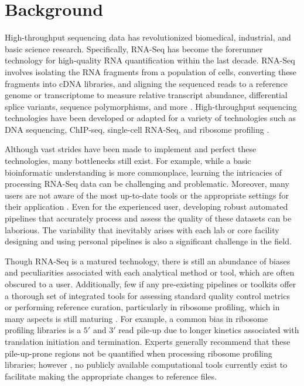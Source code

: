 \documentclass[10pt, oneside]{article}
\begin{document}
\section{Background}
High-throughput sequencing data has revolutionized biomedical, industrial, and basic science research. Specifically, RNA-Seq has become the forerunner technology for high-quality RNA quantification within the last decade. RNA-Seq involves isolating the RNA fragments from a population of cells, converting these fragments into cDNA libraries, and aligning the sequenced reads to a reference genome or transcriptome to measure relative transcript abundance, differential splice variants, sequence polymorphisms, and more \cite{byron_nrg}. High-throughput sequencing technologies have been developed or adapted for a variety of technologies such as DNA sequencing, ChIP-seq, single-cell RNA-Seq, and ribosome profiling \cite{ingolia_science}. \par
Although vast strides have been made to implement and perfect these technologies, many bottlenecks still exist. For example, while a basic bioinformatic understanding is more commonplace, learning the intricacies of processing RNA-Seq data can be challenging and problematic. Moreover, many users are not aware of the most up-to-date tools or the appropriate settings for their application \cite{costello_npjsba, funari_science}. Even for the experienced user, developing robust automated pipelines that accurately process and assess the quality of these datasets can be laborious. The variability that inevitably arises with each lab or core facility designing and using personal pipelines is also a significant challenge in the field. \par

Though RNA-Seq is a matured technology, there is still an abundance of biases and peculiarities associated with each analytical method or tool, which are often obscured to a user. Additionally, few if any pre-existing pipelines or toolkits offer a thorough set of integrated tools for assessing standard quality control metrics or performing reference curation, particularly in ribosome profiling, which in many aspects is still maturing \cite{ingolia_meth}. For example, a common bias in ribosome profiling libraries is a $5'$ and $3'$ read pile-up \cite{gerashchenko_nar, artieri_gr, hussman_plosg} due to longer kinetics associated with translation initiation and termination. Experts generally recommend that these pile-up-prone regions not be quantified when processing ribosome profiling libraries; however \cite{ingolia_meth, weinberg_reports}, no publicly available computational tools currently exist to facilitate making the appropriate changes to reference files. \par
\end{document}
